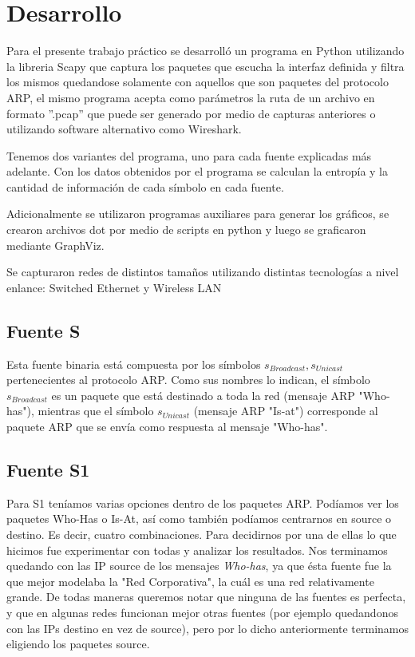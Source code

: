 \section{Desarrollo}

Para el presente trabajo práctico se desarrolló un programa en Python utilizando la libreria Scapy que captura los paquetes que escucha la interfaz definida y filtra los mismos quedandose solamente con aquellos que son paquetes del protocolo ARP, el mismo programa acepta como parámetros la ruta de un archivo en formato ''.pcap'' que puede ser generado por medio de capturas anteriores o utilizando software alternativo como Wireshark.

Tenemos dos variantes del programa, uno para cada fuente explicadas más adelante. Con los datos obtenidos por el programa se calculan la entropía y la cantidad de información de cada símbolo en cada fuente.

Adicionalmente se utilizaron programas auxiliares para generar los gráficos, se crearon archivos dot por medio de scripts en python y luego se graficaron mediante GraphViz.

Se capturaron redes de distintos tamaños utilizando distintas tecnologías a nivel enlance: Switched Ethernet y Wireless LAN


\subsection{Fuente S}
Esta fuente binaria está compuesta por los símbolos ${s_{Broadcast}, s_{Unicast}}$ pertenecientes al protocolo ARP. Como sus nombres lo indican, el símbolo $s_{Broadcast}$ es un paquete que está destinado a toda la red (mensaje ARP "Who-has"), mientras que el símbolo $s_{Unicast}$ (mensaje ARP "Is-at") corresponde al paquete ARP que se envía como respuesta al mensaje "Who-has".

\subsection{Fuente S1}
Para S1 teníamos varias opciones dentro de los paquetes ARP. Podíamos ver los paquetes Who-Has o Is-At, así como también podíamos centrarnos en source o destino. Es decir, cuatro combinaciones. Para decidirnos por una de ellas lo que hicimos fue experimentar con todas y analizar los resultados. Nos terminamos quedando con las IP source de los mensajes \textit{Who-has}, ya que ésta fuente fue la que mejor modelaba la "Red Corporativa", la cuál es una red relativamente grande. De todas maneras queremos notar que ninguna de las fuentes es perfecta, y que en algunas redes funcionan mejor otras fuentes (por ejemplo quedandonos con las IPs destino en vez de source), pero por lo dicho anteriormente terminamos eligiendo los paquetes source.

